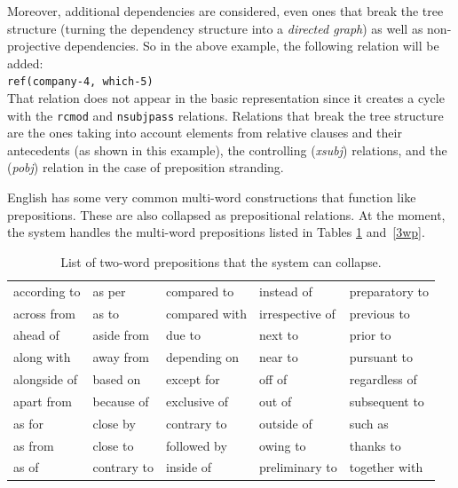 \documentclass[11pt,letter]{article}
\begin{document}
\bigskip

\noindent Moreover, additional dependencies are considered, even ones that break the tree structure (turning the dependency structure into a \emph{directed graph}) as well as non-projective dependencies. So in the above example, the following relation will be added:\\
\indent \texttt{ref(company-4, which-5)}\\
That relation does not appear in the basic representation since it creates a cycle with the \texttt{rcmod} and \texttt{nsubjpass} relations. Relations that break the tree structure are the ones taking into account elements from relative clauses and their antecedents (as shown in this example), the controlling (\emph{xsubj}) relations, and the (\emph{pobj}) relation in the case of preposition stranding.

\bigskip

English has some very common multi-word constructions that function like prepositions.  These are also collapsed as prepositional relations. At the moment, the system  handles the multi-word prepositions listed in Tables \ref{2wp} and~\ref{3wp}.


\begin{table}
\begin{center}
\begin{tabular}{lllll}\hline
according to & as per & compared to & instead of & preparatory to  \\
across from & as to &  compared with & irrespective of & previous to  \\
ahead of & aside from & due to & next to & prior to \\
along with & away from & depending on & near to & pursuant to \\
alongside of & based on & except for & off of & regardless of \\
apart from & because of & exclusive of  & out of & subsequent to \\
as for & close by & contrary to & outside of & such as \\
as from & close to & followed by & owing to & thanks to \\
as of & contrary to & inside of & preliminary to & together with\\ \hline
\end{tabular}
\caption{List of two-word prepositions that the system can collapse.}\label{2wp}
\end{center}
\end{table}
\end{document}

